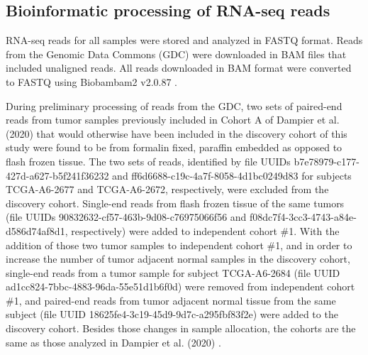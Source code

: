 \subsection*{Bioinformatic processing of RNA-seq reads}
RNA-seq reads for all samples were stored and analyzed in FASTQ format.
Reads from the Genomic Data Commons (GDC) were downloaded in BAM files that included unaligned reads.
All reads downloaded in BAM format were converted to FASTQ using Biobambam2 v2.0.87 \citep{Tischler2014}.

During preliminary processing of reads from the GDC, two sets of paired-end reads from tumor samples previously included in Cohort A of Dampier et al. (2020) \citep{Dampier2020} that would otherwise have been included in the discovery cohort of this study were found to be from formalin fixed, paraffin embedded as opposed to flash frozen tissue.
The two sets of reads, identified by file UUIDs b7e78979-c177-427d-a627-b5f241f36232 and ff6d6688-c19c-4a7f-8058-4d1bc0249d83 for subjects TCGA-A6-2677 and TCGA-A6-2672, respectively, were excluded from the discovery cohort.
Single-end reads from flash frozen tissue of the same tumors (file UUIDs 90832632-cf57-463b-9d08-c76975066f56 and f08dc7f4-3cc3-4743-a84e-d586d74af8d1, respectively) were added to independent cohort \#1.
With the addition of those two tumor samples to independent cohort \#1, and in order to increase the number of tumor adjacent normal samples in the discovery cohort, single-end reads from a tumor sample for subject TCGA-A6-2684 (file UUID ad1cc824-7bbc-4883-96da-55e51d1b6f0d) were removed from independent cohort \#1, and paired-end reads from tumor adjacent normal tissue from the same subject (file UUID 18625fe4-3c19-45d9-9d7c-a295fbf83f2e) were added to the discovery cohort.
Besides those changes in sample allocation, the cohorts are the same as those analyzed in Dampier et al. (2020) \citep{Dampier2020}.

